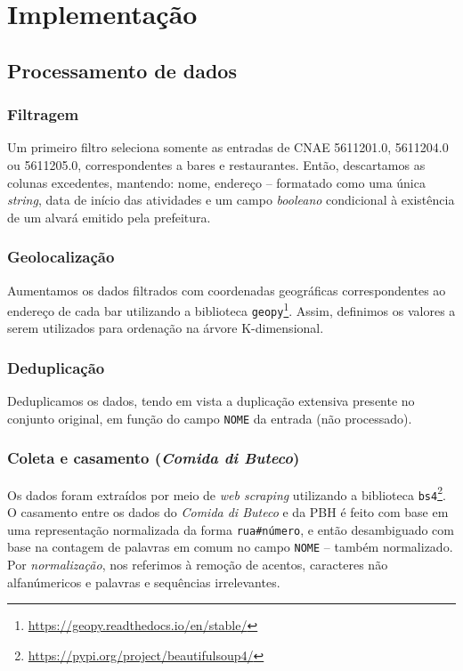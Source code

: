 \documentclass[10pt,a4paper]{article}
\begin{document}
\section{Implementação}
\label{implementation}

\subsection{Processamento de dados}
\label{data}

\subsubsection{Filtragem}
\label{filtering}
Um primeiro filtro seleciona somente as entradas de CNAE 5611201.0, 5611204.0 ou 5611205.0, correspondentes a bares e restaurantes. Então, descartamos as colunas excedentes, mantendo: nome, endereço -- formatado como uma única \textit{string}, data de início das atividades e um campo \textit{booleano} condicional à existência de um alvará emitido pela prefeitura.


\subsubsection{Geolocalização}
\label{geolocalization}
Aumentamos os dados filtrados com coordenadas geográficas correspondentes ao endereço de cada bar utilizando a biblioteca \texttt{geopy}\footnote{\url{https://geopy.readthedocs.io/en/stable/}}. Assim, definimos os valores a serem utilizados para ordenação na árvore K-dimensional. 

\subsubsection{Deduplicação}
\label{deduplication}
Deduplicamos os dados, tendo em vista a duplicação extensiva presente no conjunto original, em função do campo \texttt{NOME} da entrada (não processado).

\subsubsection{Coleta e casamento (\textit{Comida di Buteco})}
\label{cdb-scraping-and-matching}
Os dados foram extraídos por meio de \textit{web scraping} utilizando a biblioteca \texttt{bs4}\footnote{\url{https://pypi.org/project/beautifulsoup4/}}. O casamento entre os dados do \textit{Comida di Buteco} e da PBH é feito com base em uma representação normalizada da forma \texttt{rua\#número}, e então desambiguado com base na contagem de palavras em comum no campo \texttt{NOME} -- também normalizado. Por \textit{normalização}, nos referimos à remoção de acentos, caracteres não alfanúmericos e palavras e sequências irrelevantes.
\end{document}
